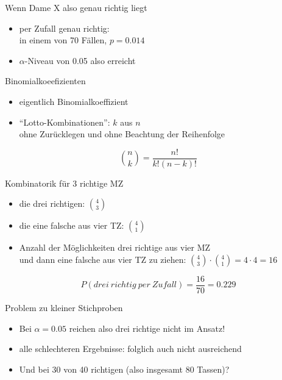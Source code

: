 \begin{frame}
  {Wenn Dame X also genau richtig liegt}
  \begin{itemize}[<+->]
    \item per Zufall genau richtig:\\
      in einem von 70 Fällen, $p=0.014$
      \Zeile
    \item $\alpha$-Niveau von 0.05 also erreicht
  \end{itemize}
\end{frame}

\begin{frame}
  {Binomialkoeefizienten}
  \begin{itemize}[<+->]
    \item eigentlich \alert{Binomialkoeffizient}
    \item "`Lotto-Kombinationen"': $k$ aus $n$\\
      ohne Zurücklegen und ohne Beachtung der Reihenfolge
  \end{itemize}
  \Zeile
  \pause
  \begin{equation}
    \binom{n}{k}=\frac{n!}{k!(n-k)!}
  \end{equation}
\end{frame}

\begin{frame}
  {Kombinatorik für 3 richtige MZ}
  \begin{itemize}[<+->]
    \item die drei richtigen: $\binom{4}{3}$
    \item die eine falsche aus vier TZ: $\binom{4}{1}$
    \item Anzahl der Möglichkeiten drei richtige aus vier MZ\\
      und dann eine falsche aus vier TZ zu ziehen: $\binom{4}{3}\cdot\binom{4}{1}=4\cdot4=16$
  \end{itemize}
  \Zeile
  \pause
  \begin{equation}
    P(drei\ richtig\ per\ Zufall)=\frac{16}{70}=0.229
  \end{equation}
\end{frame}

\begin{frame}
  {Problem zu kleiner Stichproben}
  \begin{itemize}[<+->]
    \item \alert{Bei $\alpha=0.05$ reichen also drei richtige nicht im Ansatz!}
    \item alle schlechteren Ergebnisse: folglich auch nicht ausreichend
    \item Und bei 30 von 40 richtigen (also insgesamt 80 Tassen)?
  \end{itemize}
\end{frame}


